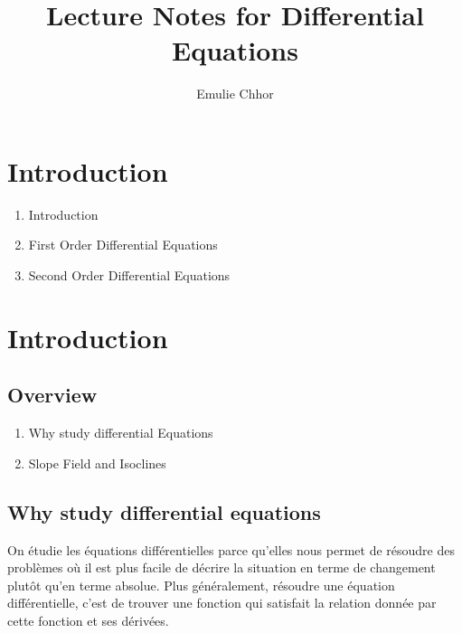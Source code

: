 \documentclass{article}
\begin{document}
\title{Lecture Notes for Differential Equations}
\author{Emulie Chhor}
\maketitle

\section*{Introduction}

\begin{enumerate}
    \item Introduction
    \item First Order Differential Equations
    \item Second Order Differential Equations
\end{enumerate}

\newtheorem{definition}{Definition}[subsection]
\newtheorem{theorem}{Theorem}[subsection]
\newtheorem{corollary}{Corollary}[subsection]
\newtheorem{lemma}[theorem]{Lemma}
\newtheorem{proposition}{Proposition}[section]
\newtheorem{axiom}{Axiome}
\newtheorem{property}{Propriété}[subsection]
\newtheorem*{remark}{Remarque}
\newtheorem*{problem}{Problème}
\newtheorem*{intuition}{Intuition}

\section{Introduction}

\subsection{Overview}%
\label{sub:Overview}

\begin{enumerate}
    \item Why study differential Equations
    \item Slope Field and Isoclines
\end{enumerate}


\subsection{Why study differential equations}%
\label{sub:Why study differential equations}

On étudie les équations différentielles parce qu'elles nous permet de
résoudre des problèmes où il est plus facile de décrire la situation
en terme de changement plutôt qu'en terme absolue. Plus généralement,
résoudre une équation différentielle, c'est de trouver une fonction qui
satisfait la relation donnée par cette fonction et ses dérivées.
\end{document}
